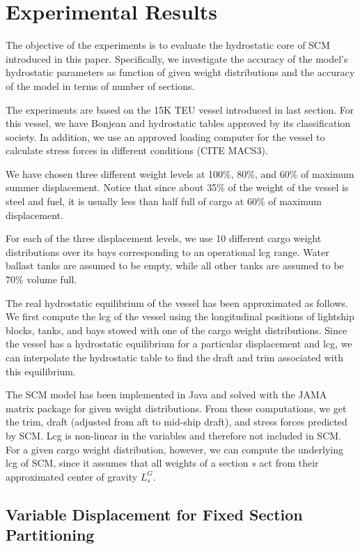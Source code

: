 \documentclass[runningheads]{llncs}
\begin{document}
 
\section{Experimental Results}
 
The objective of the experiments is to evaluate the hydrostatic core of SCM introduced in this paper. Specifically, we investigate the accuracy of the model's hydrostatic parameters as function of given weight distributions and the accuracy of the model in terms of number of sections.

The experiments are based on the 15K TEU vessel introduced in last section. For this vessel, we have Bonjean and hydrostatic tables approved by its classification society. In addition, we use an approved loading computer for the vessel to calculate stress forces in different conditions (CITE MACS3).

We have chosen three different weight levels at 100\%, 80\%, and 60\% of maximum summer displacement. Notice that since about 35\% of the weight of the vessel is steel and fuel, it is usually less than half full of cargo at 60\% of maximum displacement.   

For each of the three displacement levels, we use 10 different cargo weight distributions over its bays corresponding to an operational lcg range. Water ballast tanks are assumed to be empty, while all other tanks are assumed to be 70\% volume full.

The real hydrostatic equilibrium of the vessel has been approximated as follows. We first compute the lcg of the vessel using the longitudinal positions of lightship blocks, tanks, and bays stowed with one of the cargo weight distributions. Since the vessel has a hydrostatic equilibrium for a particular displacement and lcg, we can interpolate the hydrostatic table to find the draft and trim associated with this equilibrium.    

The SCM model has been implemented in Java and solved with the JAMA matrix package for given weight distributions. From these computations, we get the trim, draft (adjusted from aft to mid-ship draft), and stress forces predicted by SCM. Lcg is non-linear in the variables and therefore not included in SCM. For a given cargo weight distribution, however, we can compute the underlying lcg of SCM, since it assumes that all weights of a section $s$ act from their approximated center of gravity $L^G_s$. 

\subsection{Variable Displacement for Fixed Section Partitioning}
\end{document}

